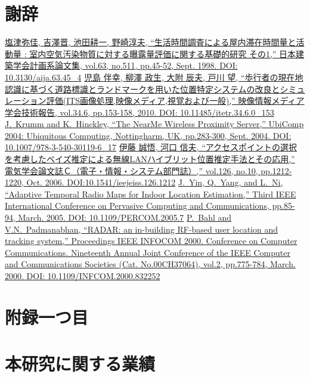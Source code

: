 \documentclass{../mnblab}
\begin{document}
\chapter*{謝辞}
\begin{thebibliography}{99}
     \href{https://doi.org/10.3130/aija.63.45_4}{塩津弥佳, 吉澤晋, 池田耕一, 野崎淳夫, ``生活時間調査による屋内滞在時間量と活動量 : 室内空気汚染物質に対する曝露量評価に関する基礎的研究 その1,'' 日本建築学会計画系論文集, vol.63, no.511, pp.45-52, Sept. 1998. DOI: 10.3130/aija.63.45\_4}
     \href{https://doi.org/10.11485/itetr.34.6.0_153}{児島 伴幸, 柳澤 政生, 大附 辰夫, 戸川 望, ``歩行者の現在地認識に基づく道路標識とランドマークを用いた位置特定システムの改良とシミュレーション評価(ITS画像処理,映像メディア,視覚および一般),'' 映像情報メディア学会技術報告, vol.34.6, pp.153-158, 2010. DOI: 10.11485/itetr.34.6.0\_153}
     \href{https://doi.org/10.1007/978-3-540-30119-6_17}{J.~Krumm and K.~Hinckley, ``The NearMe Wireless Proximity Server,'' UbiComp 2004: Ubiquitous Computing, Nottingharm, UK, pp.283-300, Sept. 2004. DOI: 10.1007/978-3-540-30119-6\_17}
     \href{https://doi.org/10.1541/ieejeiss.126.1212}{伊藤 誠悟, 河口 信夫, ``アクセスポイントの選択を考慮したベイズ推定による無線LANハイブリット位置推定手法とその応用,'' 電気学会論文誌Ｃ（電子・情報・システム部門誌）,'' vol.126, no.10, pp.1212-1220, Oct. 2006. DOI:10.1541/ieejeiss.126.1212}
     \href{https://doi.org/10.1109/PERCOM.2005.7}{J.~Yin, Q.~Yang, and L.~Ni, ``Adaptive Temporal Radio Maps for Indoor Location Estimation,'' Third IEEE International Conference on Pervasive Computing and Communications, pp.85-94, March. 2005. DOI: 10.1109/PERCOM.2005.7}
     \href{https://doi.org/10.1109/INFCOM.2000.832252}{P.~Bahl and V.N.~Padmanabhan, ``RADAR: an in-building RF-based user location and tracking system,'' Proceedings IEEE INFOCOM 2000. Conference on Computer Communications. Nineteenth Annual Joint Conference of the IEEE Computer and Communications Societies (Cat. No.00CH37064), vol.2, pp.775-784, March. 2000. DOI: 10.1109/INFCOM.2000.832252}
\end{thebibliography}


\appendix

\chapter{附録一つ目}
\chapter{本研究に関する業績}


\end{document}
